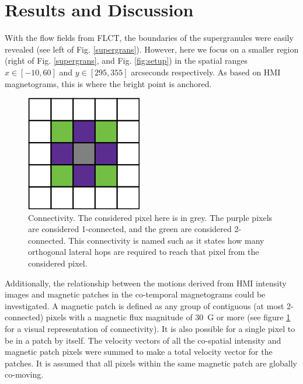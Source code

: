 \section{Results and Discussion}
\label{fluxing}
With the flow fields from FLCT, the boundaries of the supergranules were easily revealed (see left of Fig. \ref{supergrans}). However, here we focus on a smaller region (right of Fig. \ref{supergrans}, and Fig. \ref{fig:setup}) in the spatial ranges $x\in[-10, 60]$ and $y\in[295, 355]$ arcseconds respectively. As based on HMI magnetograms, this is where the bright point is anchored.
\begin{figure}
    \centering
    \includegraphics[width=0.3\linewidth]{./04CBPs/figs/connectvitity.png}
    \caption[Graphical Representation of Connectivity]{Connectivity. The considered pixel here is in grey. The purple pixels are considered 1-connected, and the green are considered 2-connected. This connectivity is named such as it states how many orthogonal lateral hops are required to reach that pixel from the considered pixel.}
    \label{fig:connect}
\end{figure}
Additionally, the relationship between the motions derived from HMI intensity images and magnetic patches in the co-temporal magnetograms could be investigated. A magnetic patch is defined as any group of contiguous (at most 2-connected) pixels with a magnetic flux magnitude of 30~G or more (see figure \ref{fig:connect} for a visual representation of connectivity). It is also possible for a single pixel to be in a patch by itself. The velocity vectors of all the co-spatial intensity and magnetic patch pixels were summed to make a total velocity vector for the patches. It is assumed that all pixels within the same magnetic patch are globally co-moving. 

